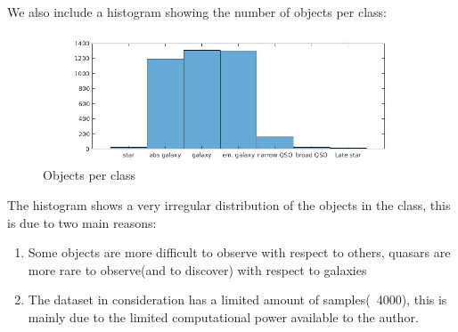 \documentclass[a4paper,10pt]{article}
\begin{document}
    \noindent We also include a histogram showing the number of objects per class:
    \begin{figure}[H]
      \caption{Objects per class}
      \centering
      \includegraphics[scale=0.4]{histogram.jpg}
    \end{figure}
    The histogram shows a very irregular distribution of the objects in the class, this is due to two main reasons:
    \begin{enumerate}
     \item Some objects are more difficult to observe with respect to others, quasars are more rare to observe(and to discover) with respect to galaxies
     \item The dataset in consideration has a limited amount of samples(~4000), this is mainly due to the limited computational power available to the author. 
    \end{enumerate}

  
\end{document}
